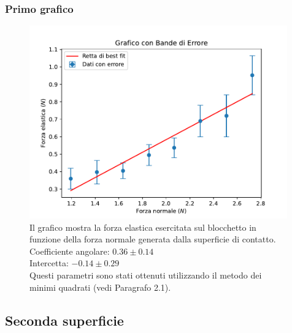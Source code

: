 \documentclass[11pt]{article}
\begin{document}
\subsubsection{Primo grafico}
\begin{figure}[H]
  \centering
  \includegraphics[width=0.99\textwidth]{grafico1.pdf}
  \caption{Il grafico mostra la forza elastica esercitata sul blocchetto in funzione della forza normale generata dalla superficie di contatto. \\
  Coefficiente angolare: $0.36\pm 0.14$ \\
  Intercetta: $-0.14\pm 0.29$ \\
  Questi parametri sono stati ottenuti utilizzando il metodo dei minimi quadrati (vedi Paragrafo 2.1).}
\end{figure}

\subsection{Seconda superficie}
\end{document}
